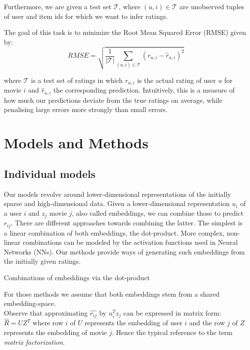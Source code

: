 \documentclass[10pt,conference,compsocconf]{IEEEtran}
\begin{document}
Furthermore, we are given a test set $\mathcal{T}$, where $(u,i) \in \mathcal{T}$ are unobserved tuples of user and item ids for which we want to infer ratings.

The goal of this task is to minimize the Root Mean Squared Error (RMSE) given by:
\begin{equation}
RMSE = \sqrt{\frac{1}{|\mathcal{T}|}\sum_{(u, i) \in \mathcal{T}} (r_{u,i} -\widehat{r}_{u,i})^2}    
\end{equation}


where $\mathcal{T}$ is a test set of ratings in which $r_{u, i}$ is the actual rating of user $u$ for movie $i$ and $\widehat{r}_{u,i}$ the corresponding prediction.
Intuitively, this is a measure of how much our predictions deviate from the true ratings on average, while penalising large errors more strongly than small errors. 


\section{Models and Methods}
\label{sec:methods}
\subsection{Individual models}
Our models revolve around lower-dimensional representations of the initially sparse and high-dimensional data. Given a lower-dimensional representation $u_i$ of a user $i$ and $z_j$ movie $j$, also called embeddings, we can combine those to predict $r_{ij}$. There are different approaches towards combining the latter. The simplest is a linear combination of both embeddings, the dot-product. More complex, non-linear combinations can be modeled by the activation functions used in Neural Networks (NNs). Our methods provide ways of generating such embeddings from the initially given ratings.

Combinations of embeddings via the dot-product

For those methods we assume that both embeddings stem from a shared embedding-space. \\
Observe that approximating $\hat{r_{ij}}$ by $u_i^Tz_j$ can be expressed in matrix form: $\hat{R} = UZ^T$ where row $i$ of $U$ represents the embedding of user $i$ and the row $j$ of $Z$ represents the embedding of movie $j$. Hence the typical reference to the term \emph{matrix factorization}.\\
\end{document}
